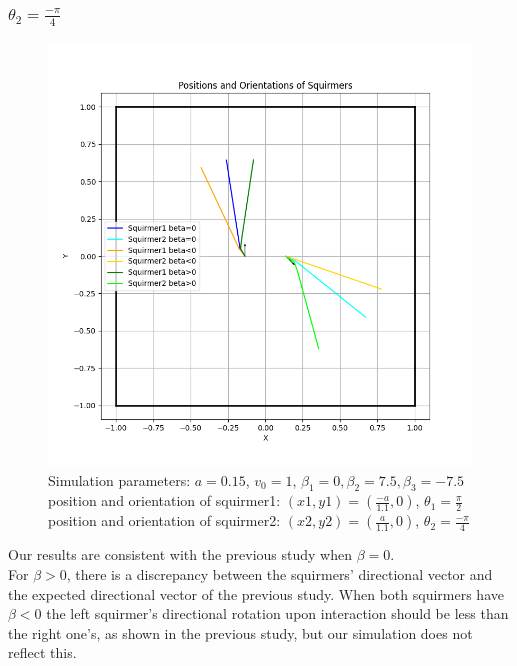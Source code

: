 \documentclass{article}
\begin{document}
\subsubsection{$\theta_2 = \frac{-\pi}{4}$}
\begin{figure}[h]
   \centering
   \includegraphics[width=1\textwidth]{graphs/simulations/twosquirmerinter/sq2.-pi.4.png}
   \caption{\footnotesize Simulation parameters: $a=0.15$, $v_0=1$, $\beta_1=0, \beta_2=7.5, \beta_3=-7.5$\\
   position and orientation of squirmer1: $(x1,y1)=(\frac{-a}{1.1},0)$, $\theta_1=\frac{\pi}{2}$\\
   position and orientation of squirmer2: $(x2,y2)=(\frac{a}{1.1},0)$, $\theta_2=\frac{-\pi}{4}$}
\end{figure}
Our results are consistent with the previous study when $\beta = 0$.\\
For $\beta > 0$, there is a discrepancy between the squirmers' directional vector and the expected
directional vector of the previous study. When both squirmers have $\beta < 0$ 
the left squirmer's directional rotation upon interaction should be less than the right one's, 
as shown in the previous study, but our simulation does not reflect this.

\newpage
\end{document}
